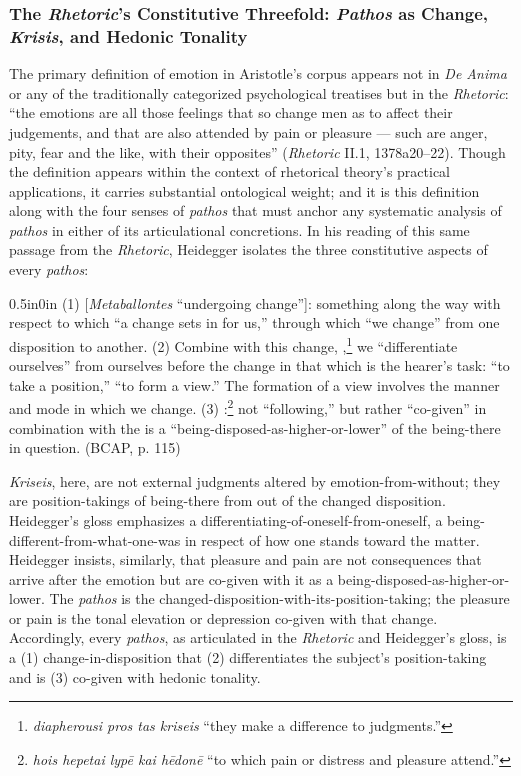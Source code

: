 \subsubsection{The \textit{Rhetoric}'s Constitutive Threefold: \textit{Pathos} as Change, \textit{Krisis}, and Hedonic Tonality}

The primary definition of emotion in Aristotle's corpus appears not in \textit{De Anima} or any of the traditionally categorized psychological treatises but in the \textit{Rhetoric}: ``the emotions are all those feelings that so change men as to affect their judgements, and that are also attended by pain or pleasure --- such are anger, pity, fear and the like, with their opposites'' (\textit{Rhetoric} II.1, 1378a20--22). Though the definition appears within the context of rhetorical theory's practical applications, it carries substantial ontological weight; and it is this definition along with the four senses of \textit{pathos} that must anchor any systematic analysis of \textit{pathos} in either of its articulational concretions. In his reading of this same passage from the \textit{Rhetoric}, Heidegger isolates the three constitutive aspects of every \textit{pathos}:
\begin{adjustwidth}{0.5in}{0in}
(1)  [\textit{Metaballontes} ``undergoing change'']: something along the way with respect to which ``a change sets in for us,'' through which ``we change'' from one disposition to another. (2) Combine with this change, ,\footnote{\textit{diapherousi pros tas kriseis} ``they make a difference to judgments.''} we ``differentiate ourselves'' from ourselves before the change in that which is the hearer's task: ``to take a position,'' ``to form a view.'' The formation of a view involves the manner and mode in which we change. (3) :\footnote{\textit{hois hepetai lypē kai hēdonē} ``to which pain or distress and pleasure attend.''} not ``following,'' but rather ``co-given'' in combination with the  is a ``being-disposed-as-higher-or-lower'' of the being-there in question. (BCAP, p. 115)
\end{adjustwidth}

\textit{Kriseis}, here, are not external judgments altered by emotion-from-without; they are position-takings of being-there from out of the changed disposition. Heidegger's gloss emphasizes a differentiating-of-oneself-from-oneself, a being-different-from-what-one-was in respect of how one stands toward the matter. Heidegger insists, similarly, that pleasure and pain are not consequences that arrive after the emotion but are co-given with it as a being-disposed-as-higher-or-lower. The \textit{pathos} is the changed-disposition-with-its-position-taking; the pleasure or pain is the tonal elevation or depression co-given with that change. Accordingly, every \textit{pathos}, as articulated in the \textit{Rhetoric} and Heidegger's gloss, is a (1) change-in-disposition that (2) differentiates the subject's position-taking and is (3) co-given with hedonic tonality.

